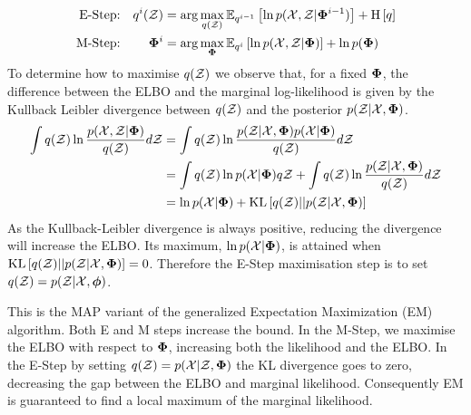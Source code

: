 \begin{align}
\text{E-Step:} & & q^i(\zdat) & = \arg \max_{q(\zdat)} \ex{\ln p(\xdat, \zdat|\params^{i-1})}{q^{i-1}} + \ent{q} \label{eqn:estep} \\
\text{M-Step:} & & \params^i & = \arg \max_{\params} \ex{\ln \joint}{q^{i}} + \ln p(\params) \label{eqn:mstep}
\end{align}
To determine how to maximise $q(\zdat)$ we observe that, for a fixed $\params$, the difference between the ELBO and the marginal log-likelihood is given by
 the Kullback Leibler divergence between $q(\zdat)$ and the posterior $p(\zdat|\xdat, \params)$.
\begin{align}
\int q(\zdat) \ln \frac{p(\xdat, \zdat|\params)}{q(\zdat)} d\zdat
& = \int q(\zdat) \ln \frac{p(\zdat|\xdat, \params)p(\xdat | \params)}{q(\zdat)} d\zdat \\
& = \int q(\zdat) \ln p(\xdat | \params) q\zdat + \int q(\zdat)\ln\frac{p(\zdat|\xdat, \params)}{q(\zdat)} d\zdat \\
& = \ln p(\xdat | \params) + \kl{q(\zdat)}{p(\zdat|\xdat, \params)}
\end{align}
As the Kullback-Leibler divergence is always positive, reducing the divergence will increase the ELBO. Its maximum, $\ln p(\xdat | \params)$, is attained when $\kl{q(\zdat)}{p(\zdat|\xdat, \params)} = 0$. Therefore the  E-Step maximisation step is to set $q(\zdat) = p(\zdat | \xdat, \param)$.

This is the MAP variant of the generalized Expectation Maximization (EM) algorithm. Both E and M steps increase the bound. In the M-Step, we maximise the ELBO with respect to $\params$, increasing both the likelihood and the ELBO. In the E-Step by setting $q(\zdat) = p(\xdat|\zdat, \params)$ the KL divergence goes to zero, decreasing the gap between the ELBO and marginal likelihood. Consequently EM is guaranteed to find a local maximum of the marginal likelihood\cite{Dempster1977}.

